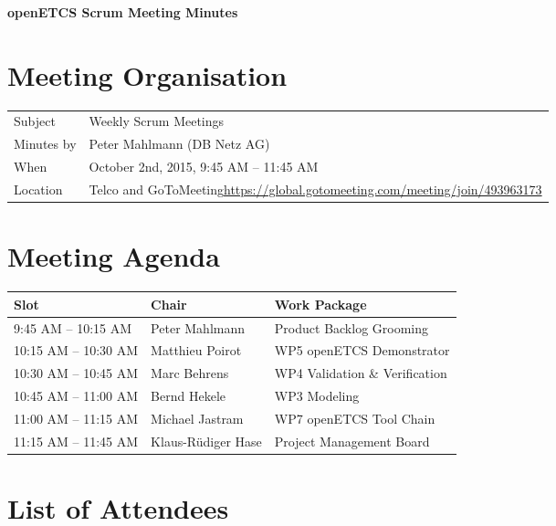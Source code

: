 \documentclass[a4paper, 11pt]{article}
\begin{document}
{\begin{center}\huge\bf openETCS Scrum Meeting Minutes\end{center}}

\section{Meeting Organisation}

\renewcommand{\arraystretch}{1.5}
\begin{supertabular}{m{.2\textwidth}m{.8\textwidth}}
Subject & Weekly Scrum Meetings\\
Minutes by & Peter Mahlmann (DB Netz AG)\\
When & October 2nd, 2015, 9:45 AM -- 11:45 AM\\
Location & Telco and GoToMeeting\newline \url{https://global.gotomeeting.com/meeting/join/493963173}\\
\end{supertabular}

\renewcommand{\arraystretch}{1.0}
\section{Meeting Agenda}

\begin{tabular}{lll}
\toprule
\textbf{Slot} &  \textbf{Chair} & \textbf{Work Package} \\
\midrule 
9:45 AM -- 10:15 AM & Peter Mahlmann & Product Backlog Grooming  \\
10:15 AM -- 10:30 AM & Matthieu Poirot & WP5 openETCS Demonstrator \\  
10:30 AM -- 10:45 AM & Marc Behrens & WP4 Validation \& Verification \\
10:45 AM -- 11:00 AM & Bernd Hekele & WP3 Modeling \\
11:00 AM -- 11:15 AM & Michael Jastram & WP7 openETCS Tool Chain \\
11:15 AM -- 11:45 AM & Klaus-R\"udiger Hase & Project Management Board \\
\bottomrule
\end{tabular}

\section{List of Attendees}
\end{document}
